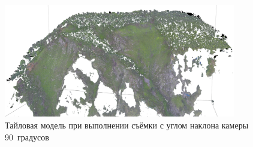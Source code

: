 \begin{figure}[h!]
  \begin{center}
    \includegraphics[width=0.9\textwidth]{authors/efremov-fig1.png}
  \end{center}
  \caption{Тайловая модель при выполнении съёмки с углом наклона камеры 90~градусов}
  \label{fig:efremov-fig1}
\end{figure}
